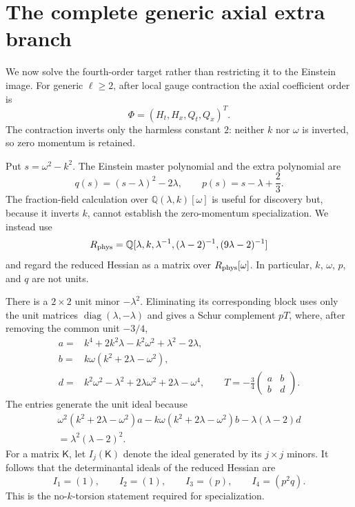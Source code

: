 \documentclass[11pt]{article}
\theoremstyle{remark}
\begin{document}
\section{The complete generic axial extra branch}\label{sec:extra}

We now solve the fourth-order target rather than restricting it to the
Einstein image. For generic $\ell\geq2$, after local gauge contraction the
axial coefficient order is
\begin{equation}
 \Phi=(H_t,H_x,Q_t,Q_x)^T.
\end{equation}
The contraction inverts only the harmless constant $2$: neither $k$ nor
$\omega$ is inverted, so zero momentum is retained.

Put $s=\omega^2-k^2$. The Einstein master polynomial and the extra polynomial
are
\begin{equation}
 q(s)=(s-\lambda)^2-2\lambda,\qquad p(s)=s-\lambda+\frac23.
\end{equation}
The fraction-field calculation over $\mathbb Q(\lambda,k)[\omega]$ is useful
for discovery but, because it inverts $k$, cannot establish the zero-momentum
specialization. We instead use
\begin{equation}\label{eq:physical-ring}
 R_{\rm phys}=\mathbb Q[\lambda,k,
 \lambda^{-1},(\lambda-2)^{-1},(9\lambda-2)^{-1}]
\end{equation}
and regard the reduced Hessian as a matrix over
$R_{\rm phys}[\omega]$. In particular, $k$, $\omega$, $p$, and $q$ are not
units.

There is a $2\times2$ unit minor $-\lambda^2$. Eliminating its corresponding
block uses only the unit matrices $\operatorname{diag}(\lambda,-\lambda)$
and gives a Schur complement $pT$, where, after removing the common unit
$-3/4$,
\begin{align}
 a={}&k^4+2k^2\lambda-k^2\omega^2+\lambda^2-2\lambda,\nonumber\\
 b={}&k\omega(k^2+2\lambda-\omega^2),\nonumber\\
 d={}&k^2\omega^2-\lambda^2+2\lambda\omega^2+2\lambda-\omega^4,
 \qquad T=-\frac34\begin{pmatrix}a&b\\b&d\end{pmatrix}.
 \label{eq:physical-ring-T}
\end{align}
The entries generate the unit ideal because
\begin{multline}\label{eq:physical-ring-bezout}
 \omega^2(k^2+2\lambda-\omega^2)a
 -k\omega(k^2+2\lambda-\omega^2)b
 -\lambda(\lambda-2)d\\
 =\lambda^2(\lambda-2)^2.
\end{multline}
For a matrix $\mathsf K$, let $I_j(\mathsf K)$ denote the ideal generated by
its $j\times j$ minors. It follows that the determinantal ideals of the
reduced Hessian are
\begin{equation}\label{eq:physical-fitting}
 I_1=(1),\qquad I_2=(1),\qquad I_3=(p),\qquad I_4=(p^2q).
\end{equation}
This is the no-$k$-torsion statement required for specialization.
\end{document}
